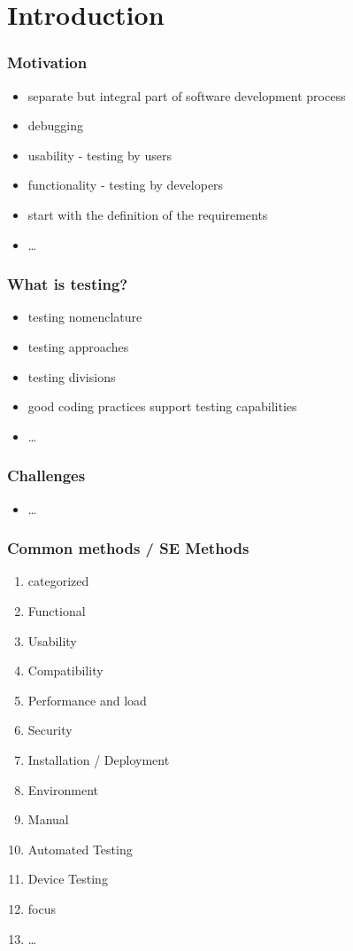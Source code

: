 
\section{Introduction}

\begin{frame}[fragile]
\frametitle{Motivation}
\begin{itemize}
\item separate but integral part of software development process
\item debugging
\item usability - testing by users
\item functionality - testing by developers
\item start with the definition of the requirements
\item \ldots
\end{itemize}
\end{frame}

\begin{frame}[fragile]
\frametitle{What is testing?}
\begin{itemize}
\item testing nomenclature
\item testing approaches
\item testing divisions
\item good coding practices support testing capabilities
\item \ldots
\end{itemize}
\end{frame}

\begin{frame}[fragile]
\frametitle{Challenges}
\begin{itemize}
\item \ldots
\end{itemize}
\end{frame}

\begin{frame}[fragile]
\frametitle{Common methods / SE Methods}
\begin{enumerate}
\item categorized 
\item Functional
\item Usability
\item Compatibility
\item Performance and load
\item Security
\item Installation / Deployment
\item Environment
\item Manual 
\item Automated Testing
\item Device Testing
\item focus
\item \ldots
\end{enumerate}
\end{frame}


